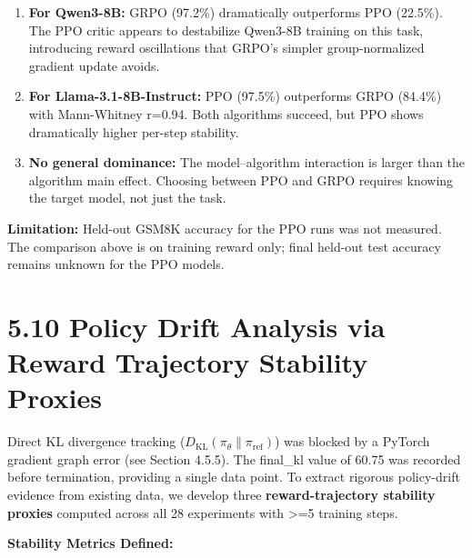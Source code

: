 \documentclass[
  american,
  11pt,
  a4paper,
  oneside]{report}
\begin{document}
\begin{enumerate}
\def\labelenumi{\arabic{enumi}.}
\item
  \textbf{For Qwen3-8B:} GRPO (97.2\%) dramatically outperforms PPO
  (22.5\%). The PPO critic appears to destabilize Qwen3-8B training on
  this task, introducing reward oscillations that GRPO's simpler
  group-normalized gradient update avoids.
\item
  \textbf{For Llama-3.1-8B-Instruct:} PPO (97.5\%) outperforms GRPO
  (84.4\%) with Mann-Whitney r=0.94. Both algorithms succeed, but PPO
  shows dramatically higher per-step stability.
\item
  \textbf{No general dominance:} The model--algorithm interaction is
  larger than the algorithm main effect. Choosing between PPO and GRPO
  requires knowing the target model, not just the task.
\end{enumerate}

\textbf{Limitation:} Held-out GSM8K accuracy for the PPO runs was not
measured. The comparison above is on training reward only; final
held-out test accuracy remains unknown for the PPO models.

\section{5.10 Policy Drift Analysis via Reward Trajectory Stability
Proxies}\label{policy-drift-analysis-via-reward-trajectory-stability-proxies}

Direct KL divergence tracking
(\(D_{\text{KL}}(\pi_\theta \| \pi_{\text{ref}})\)) was blocked by a
PyTorch gradient graph error (see Section 4.5.5). The final\_kl value of
60.75 was recorded before termination, providing a single data point. To
extract rigorous policy-drift evidence from existing data, we develop
three \textbf{reward-trajectory stability proxies} computed across all
28 experiments with \textgreater=5 training steps.

\textbf{Stability Metrics Defined:}
\end{document}
